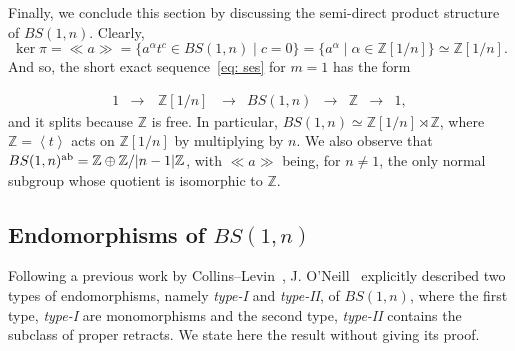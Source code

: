 \documentclass[a4paper]{amsart}
\theoremstyle{definition}
\newcommand\ZZ{\mathbb{Z}}
\newcommand{\gen}[1]{\left\langle#1\right\rangle}
\newcommand{\ncl}[1]{\ll \!#1 \!\gg}
\begin{document}
Finally, we conclude this section by discussing the semi-direct product structure of $BS(1,n)$. Clearly,
%
\[
\ker \pi =\ncl{a} =\{a^{\alpha}t^c\in BS(1,n) \mid c=0\}=\{a^{\alpha} \mid \alpha\in \ZZ[1/n]\}\simeq \ZZ[1/n].
\]
%
And so, the short exact sequence~\eqref{eq: ses} for $m=1$ has the form

\begin{equation*}
\begin{array}{ccccccccc} 1 & \to\, & \ZZ[1/n] & \, \to & BS(1,n) & \to & \ZZ & \to & 1,
\end{array}
 \end{equation*}
and it splits because $\ZZ$ is free. In particular, $BS(1,n) \simeq \ZZ[1/n] \rtimes \ZZ$, where $\ZZ = \gen{t}$ acts on $\ZZ[1/n]$ by multiplying by $n$. We also observe that $BS(1,n)^{\rm ab}=\ZZ \oplus \ZZ/|n-1|\ZZ$, with $\ncl{a}$ being, for $n\neq 1$, the only normal subgroup whose quotient is isomorphic to $\ZZ$.


\subsection{\boldmath Endomorphisms of $BS(1,n)$}\label{sec: endos}

Following a previous work by Collins--Levin~\cite{CoLe}, J. O'Neill~\cite{N} explicitly described two types of endomorphisms, namely \textit{type-I} and \textit{type-II}, of $BS(1,n)$, where the first type, \textit{type-I} are monomorphisms and the second type, \textit{type-II} contains the subclass of proper retracts. We state here the result without giving its proof. 
\end{document}
